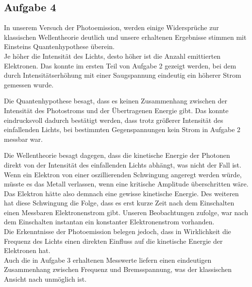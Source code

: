 \subsection{Aufgabe 4}

In unserem Versuch der Photoemission, werden einige Widersprüche zur klassischen Wellentheorie deutlich und unsere erhaltenen Ergebnisse stimmen mit Einsteins Quantenhypothese überein.\\

Je höher die Intensität des Lichts, desto höher ist die Anzahl emittierten Elektronen. Das konnte im ersten Teil von Aufgabe 2 gezeigt werden, bei dem durch Intensitätserhöhung mit einer Saugspannung eindeutig ein höherer Strom gemessen wurde.

Die Quantenhypothese besagt, dass es keinen Zusammenhang zwischen der Intensität des Photostroms und der Übertragenen Energie gibt. Das konnte eindrucksvoll dadurch bestätigt werden, dass trotz größerer Intensität des einfallenden Lichts, bei bestimmten Gegenspannungen kein Strom in Aufgabe 2 messbar war.


Die Wellentheorie besagt dagegen, dass die kinetische Energie der Photonen direkt von der Intensität des einfallenden Lichts abhängt, was nicht der Fall ist. Wenn ein Elektron von einer oszillierenden Schwingung angeregt werden würde, müsste es das Metall verlassen, wenn eine kritische Amplitude überschritten wäre. Das Elektron hätte also demnach eine gewisse kinetische Energie. Des weiteren hat diese Schwingung die Folge, dass es erst kurze Zeit nach dem Einschalten einen Messbaren Elektronenstrom gibt. Unseren Beobachtungen zufolge, war nach dem Einschalten instantan ein konstanter Elektronenstrom vorhanden.\\
Die Erkenntnisse der Photoemission belegen jedoch, dass in Wirklichkeit die Frequenz des Lichts einen direkten Einfluss auf die kinetische Energie der Elektronen hat.\\
Auch die in Aufgabe 3 erhaltenen Messwerte liefern einen eindeutigen Zusammenhang zwischen Frequenz und Bremsspannung, was der klassischen Ansicht nach unmöglich ist.